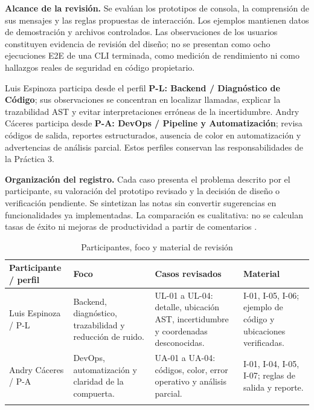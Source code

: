 \textbf{Alcance de la revisión.} Se evalúan los prototipos de consola, la comprensión de sus mensajes y las reglas propuestas de interacción. Los ejemplos mantienen datos de demostración y archivos controlados. Las observaciones de los usuarios constituyen evidencia de revisión del diseño; no se presentan como ocho ejecuciones E2E de una CLI terminada, como medición de rendimiento ni como hallazgos reales de seguridad en código propietario.

Luis Espinoza participa desde el perfil \textbf{P-L: Backend / Diagnóstico de Código}; sus observaciones se concentran en localizar llamadas, explicar la trazabilidad AST y evitar interpretaciones erróneas de la incertidumbre. Andry Cáceres participa desde \textbf{P-A: DevOps / Pipeline y Automatización}; revisa códigos de salida, reportes estructurados, ausencia de color en automatización y advertencias de análisis parcial. Estos perfiles conservan las responsabilidades de la Práctica 3.

\textbf{Organización del registro.} Cada caso presenta el problema descrito por el participante, su valoración del prototipo revisado y la decisión de diseño o verificación pendiente. Se sintetizan las notas sin convertir sugerencias en funcionalidades ya implementadas. La comparación es cualitativa: no se calculan tasas de éxito ni mejoras de productividad a partir de comentarios \parencite{myers2011art,pyreachrevisionusuarios}.

\begin{table}[H]
\centering\small{}
\caption{Participantes, foco y material de revisión}
\begin{tabularx}{\textwidth}{P{3cm}YYY}
\toprule
\textbf{Participante / perfil} & \textbf{Foco} & \textbf{Casos revisados} & \textbf{Material} \\
\midrule
Luis Espinoza / P-L & Backend, diagnóstico, trazabilidad y reducción de ruido. & UL-01 a UL-04: detalle, ubicación AST, incertidumbre y coordenadas desconocidas. & I-01, I-05, I-06; ejemplo de código y ubicaciones verificadas. \\
\addlinespace
Andry Cáceres / P-A & DevOps, automatización y claridad de la compuerta. & UA-01 a UA-04: códigos, color, error operativo y análisis parcial. & I-01, I-04, I-05, I-07; reglas de salida y reporte. \\
\addlinespace
\bottomrule
\end{tabularx}
\end{table}

